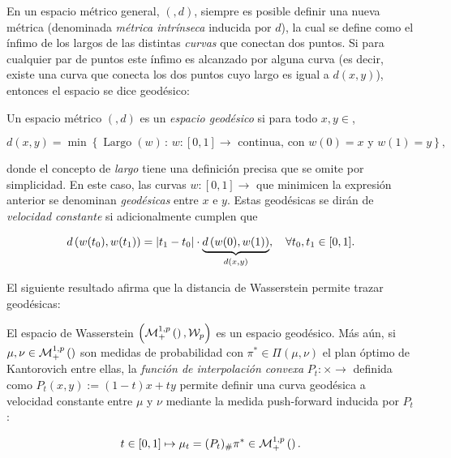 En un espacio métrico general, $(\xspace,d)$, siempre es posible definir una nueva métrica (denominada \textit{métrica intrínseca} inducida por $d$), la cual se define como el ínfimo de los largos de las distintas \textit{curvas} que conectan dos puntos. Si para cualquier par de puntos este ínfimo es alcanzado por alguna curva (es decir, existe una curva que conecta los dos puntos cuyo largo es igual a $d(x,y)$), entonces el espacio se dice geodésico:

\begin{defn}
	Un espacio métrico $(\xspace,d)$ es un \textit{espacio geodésico} si para todo $x,y\in\xspace$,

	\begin{equation*}
		d(x,y) = \min \left\{\operatorname{Largo}(w)\,:\, w:[0,1]\to\xspace\text{ continua, con } w(0)=x \text{ y } w(1)=y\right\},
	\end{equation*}

	donde el concepto de \textit{largo} tiene una definición precisa que se omite por simplicidad. En este caso, las curvas $w:[0,1]\to\xspace$ que minimicen la expresión anterior se denominan \textit{geodésicas} entre $x$ e $y$. Estas geodésicas se dirán de \textit{velocidad constante} si adicionalmente cumplen que

	\begin{equation*}
		d\left(w(t_0),w(t_1)\right) = |t_1-t_0| \cdot \underbrace{d\left(w(0),w(1)\right)}_{d(x,y)},
		\quad\forall t_0,t_1\in[0,1].
	\end{equation*}
\end{defn}

El siguiente resultado afirma que la distancia de Wasserstein permite trazar geodésicas:

\begin{teo}[$\probmeasurep{\xspace}$ es un espacio geodésico]
	\label{teo:wasserstein_geodesic}
	El espacio de Wasserstein $\left(\mathcal{M}_+^{1,p}\left(\right), \mathcal{W}_p\right)$ es un espacio geodésico. Más aún, si $\mu,\nu\in\mathcal{M}_+^{1,p}\left(\right)$ son medidas de probabilidad con $\pi^*\in\Pi(\mu,\nu)$ el plan óptimo de Kantorovich entre ellas, la \textit{función de interpolación convexa} $P_t:\xspace\times\xspace\to\xspace$ definida como $P_t(x,y) := (1-t)x + ty$ permite definir una curva geodésica a velocidad constante entre $\mu$ y $\nu$ mediante la medida push-forward inducida por $P_t$:

	\begin{equation*}
		t\in[0,1] \mapsto \mu_t = (P_t)_\#\pi^* \in\mathcal{M}_+^{1,p}\left(\right).
	\end{equation*}
\end{teo}

